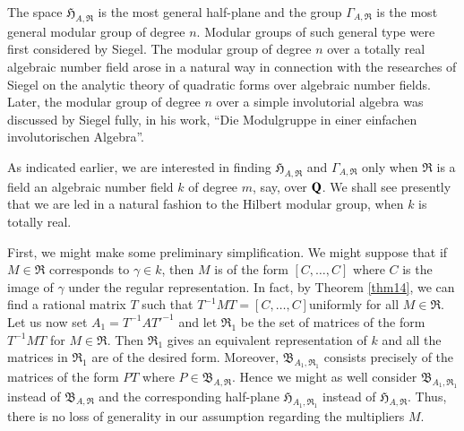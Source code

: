 The space $\mathfrak{H}_{A,\mathfrak{R}}$ is the most general
half-plane and the group $\Gamma_{A,\mathfrak{R}}$ is the most general
modular group of degree $n$. Modular groups of such general type were
first considered by Siegel. The modular group of degree $n$ over a
totally real algebraic number field arose in a natural way in
connection with the researches of Siegel on the analytic theory of
quadratic forms over algebraic number fields. Later, the modular group
of degree $n$ over a simple involutorial algebra was discussed by
Siegel fully, in his work, ``Die Modulgruppe in einer einfachen
involutorischen Algebra''.

As indicated earlier, we are interested in finding
$\mathfrak{H}_{A,\mathfrak{R}}$ and $\Gamma_{A,\mathfrak{R}}$ only when
$\mathfrak{R}$ is a field \ie an algebraic number field $k$ of degree
$m$, say, over $\mathbf{Q}$. We shall see presently that we are led in a
natural fashion to the Hilbert modular group, when $k$ is totally
real.

First, we might make some preliminary simplification. We might suppose
that if $M\in\mathfrak{R}$ corresponds to $\gamma\in k$, then $M$ is
of the form $[C,\ldots,C]$ where $C$ is the image of $\gamma$ under
the regular representation. In fact, by Theorem \ref{thm14}, we can
find a rational matrix $T$ such that
$T^{-1}MT=[C,\ldots,C]$\pageoriginale uniformly for all
$M\in\mathfrak{R}$. Let us now set $A_{1}=T^{-1}{AT'}^{-1}$ and let
$\mathfrak{R}_{1}$ be the set of matrices of the form $T^{-1}MT$ for
$M\in\mathfrak{R}$. Then $\mathfrak{R}_{1}$ gives an equivalent
representation of $k$ and all the matrices in $\mathfrak{R}_{1}$ are
of the desired form. Moreover, $\mathfrak{B}_{A_{1},\mathfrak{R}_{1}}$
consists precisely of the matrices of the form $PT$ where
$P\in\mathfrak{B}_{A,\mathfrak{R}}$. Hence we might as well consider
$\mathfrak{B}_{A_{1},\mathfrak{R}_{1}}$ instead of
$\mathfrak{B}_{A,\mathfrak{R}}$ and the corresponding half-plane
$\mathfrak{H}_{A_{1},\mathfrak{R}_{1}}$ instead of
$\mathfrak{H}_{A,\mathfrak{R}}$. Thus, there is no loss of generality
in our assumption regarding the multipliers $M$.

